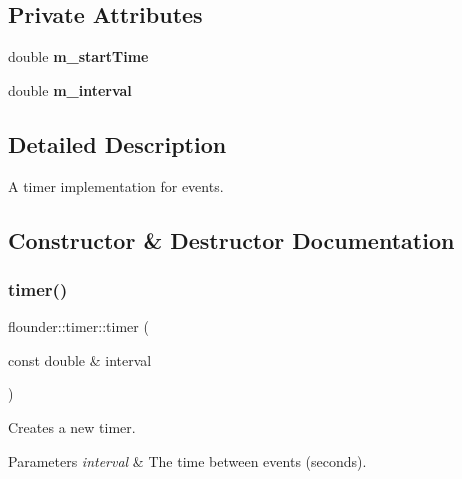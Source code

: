 \subsection*{Private Attributes}
\begin{DoxyCompactItemize}
\item 
\mbox{\label{classflounder_1_1timer_a7ef146a638759f7f7737e4f2f2005780}} 
double {\bfseries m\+\_\+start\+Time}
\item 
\mbox{\label{classflounder_1_1timer_a02ec188db6ae400abd0a6ecfe5a421fc}} 
double {\bfseries m\+\_\+interval}
\end{DoxyCompactItemize}


\subsection{Detailed Description}
A timer implementation for events. 



\subsection{Constructor \& Destructor Documentation}
\mbox{\label{classflounder_1_1timer_afbe92e026c43d2cacb8172963e4ab6d9}} 
\subsubsection{\texorpdfstring{timer()}{timer()}}
{\footnotesize\ttfamily flounder\+::timer\+::timer (\begin{DoxyParamCaption}\item[{const double \&}]{interval }\end{DoxyParamCaption})}



Creates a new timer. 


\begin{DoxyParams}{Parameters}
{\em interval} & The time between events (seconds). \\
\hline
\end{DoxyParams}
\mbox{\label{classflounder_1_1timer_a2644c550b3bb6aa1c757287a72ff9179}} 
